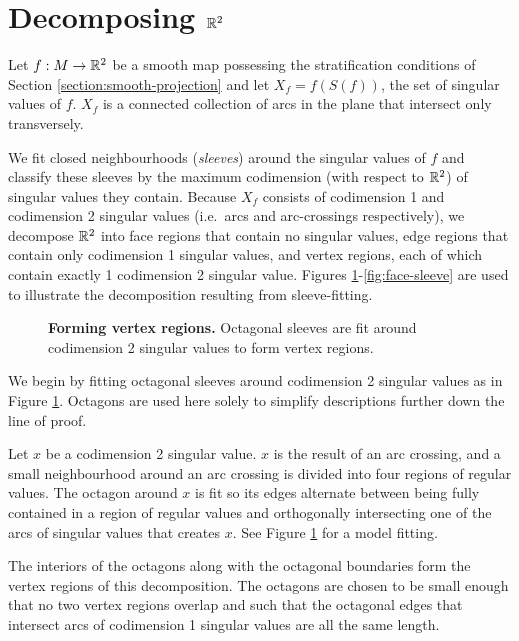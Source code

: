 \section{Decomposing $\mathbb{R}^2$}
\label{section:smooth-decompose}

Let $f:M\to\mathbb{R}^2$ be a smooth map possessing the stratification conditions of Section \ref{section:smooth-projection} and let $X_f = f(S(f))$, the set of singular values of $f$.
$X_f$ is a connected collection of arcs in the plane that intersect only transversely.

We fit closed neighbourhoods (\emph{sleeves}) around the singular values of $f$ and classify these sleeves by the maximum codimension (with respect to $\mathbb{R}^2$) of singular values they contain.
Because $X_f$ consists of codimension 1 and codimension 2 singular values (i.e.\ arcs and arc-crossings respectively), we decompose $\mathbb{R}^2$ into face regions that contain no singular values, edge regions that contain only codimension 1 singular values, and vertex regions, each of which contain exactly 1 codimension 2 singular value.
Figures \ref{fig:vertex-sleeve}-\ref{fig:face-sleeve} are used to illustrate the decomposition resulting from sleeve-fitting.

\begin{figure}[h!]
	\label{fig:vertex-sleeve}
	\caption{
		\textbf{Forming vertex regions.}
		Octagonal sleeves are fit around codimension 2 singular values to form vertex regions.
	}
\end{figure}

We begin by fitting octagonal sleeves around codimension 2 singular values as in Figure \ref{fig:vertex-sleeve}.
Octagons are used here solely to simplify descriptions further down the line of proof.

Let $x$ be a codimension 2 singular value.
$x$ is the result of an arc crossing, and a small neighbourhood around an arc crossing is divided into four regions of regular values.
The octagon around $x$ is fit so its edges alternate between being fully contained in a region of regular values and orthogonally intersecting one of the arcs of singular values that creates $x$.
See Figure \ref{fig:vertex-sleeve} for a model fitting.

The interiors of the octagons along with the octagonal boundaries form the vertex regions of this decomposition.
The octagons are chosen to be small enough that no two vertex regions overlap and such that the octagonal edges that intersect arcs of codimension 1 singular values are all the same length.

